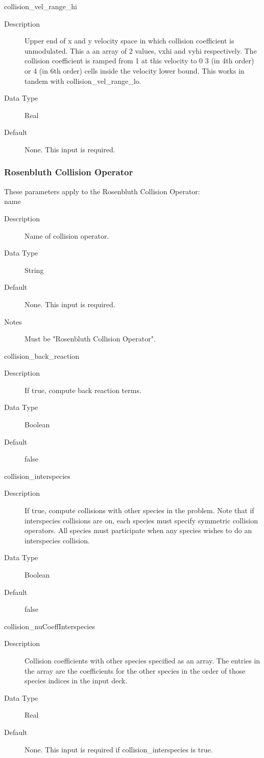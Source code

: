 \documentclass[11pt]{amsart}
\begin{document}
collision\_vel\_range\_hi
\begin{description}
\item [Description] Upper end of x and y velocity space in which collision
coefficient is unmodulated.  This a an array of 2 values, vxhi and vyhi
respectively.  The collision coefficient is ramped from 1 at this velocity to 0
3 (in 4th order) or 4 (in 6th order) cells inside the velocity lower bound.
This works in tandem with collision\_vel\_range\_lo.
\item [Data Type] Real
\item [Default] None.  This input is required.
\end{description}

\subsubsection*{Rosenbluth Collision Operator}
These parameters apply to the Rosenbluth Collision Operator: \\
\indent name
\begin{description}
\item [Description] Name of collision operator.
\item [Data Type] String
\item [Default] None.  This input is required.
\item [Notes] Must be "Rosenbluth Collision Operator".
\end{description}

collision\_back\_reaction
\begin{description}
\item [Description] If true, compute back reaction terms.
\item [Data Type] Boolean
\item [Default] false
\end{description}

collision\_interspecies
\begin{description}
\item [Description] If true, compute collisions with other species in the
problem.  Note that if interspecies collisions are on, each species must
specify symmetric collision operators.  All species must participate when
any species wishes to do an interspecies collision.
\item [Data Type] Boolean
\item [Default] false
\end{description}

collision\_nuCoeffInterspecies
\begin{description}
\item [Description] Collision coefficients with other species specified as an
array.  The entries in the array are the coefficients for the other species in
the order of those species indices in the input deck.
\item [Data Type] Real
\item [Default] None.  This input is required if collision\_interspecies is true.
\end{description}
\end{document}
